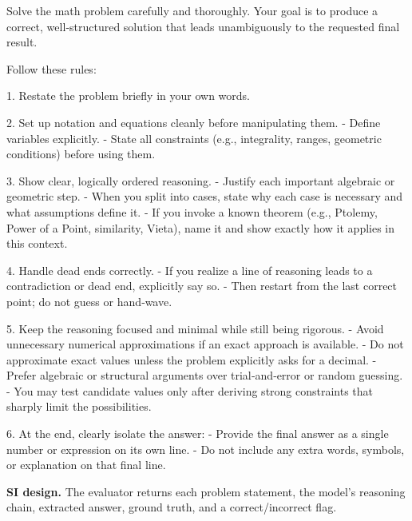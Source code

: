 \documentclass[sigconf,anonymous,review]{acmart}
\newcommand{\asi}{SI}
\begin{document}
\begin{promptbox}
Solve the math problem carefully and thoroughly. Your goal is to produce a correct,
well‑structured solution that leads unambiguously to the requested final result.

Follow these rules:

1. Restate the problem briefly in your own words.

2. Set up notation and equations cleanly before manipulating them.
   - Define variables explicitly.
   - State all constraints (e.g., integrality, ranges, geometric conditions) before
     using them.

3. Show clear, logically ordered reasoning.
   - Justify each important algebraic or geometric step.
   - When you split into cases, state why each case is necessary and what assumptions
     define it.
   - If you invoke a known theorem (e.g., Ptolemy, Power of a Point, similarity, Vieta),
     name it and show exactly how it applies in this context.

4. Handle dead ends correctly.
   - If you realize a line of reasoning leads to a contradiction or dead end, explicitly
     say so.
   - Then restart from the last correct point; do not guess or hand‑wave.
   
5. Keep the reasoning focused and minimal while still being rigorous.
   - Avoid unnecessary numerical approximations if an exact approach is available.
   - Do not approximate exact values unless the problem explicitly asks for a decimal.
   - Prefer algebraic or structural arguments over trial‑and‑error or random guessing.
   - You may test candidate values only after deriving strong constraints that sharply
     limit the possibilities.

6. At the end, clearly isolate the answer:
   - Provide the final answer as a single number or expression on its own line.
   - Do not include any extra words, symbols, or explanation on that final line.
\end{promptbox}
\label{fig:optimized-prompt}

\textbf{\asi{} design.} The evaluator returns each problem statement, the model's reasoning chain, extracted answer, ground truth, and a correct/incorrect flag.
\end{document}
